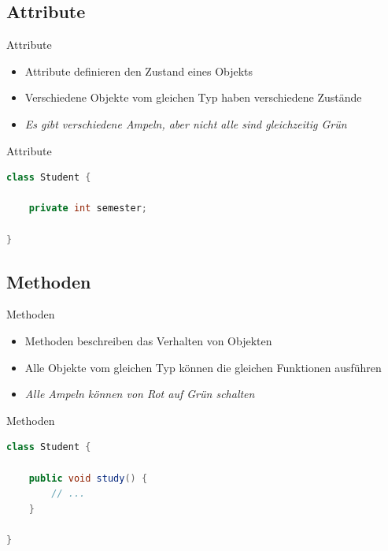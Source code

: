 \documentclass[18pt]{beamer}
\begin{document}
\subsection{Attribute}

\begin{frame}{Attribute}
    \begin{itemize}
        \item Attribute definieren den Zustand eines Objekts
        \item Verschiedene Objekte vom gleichen Typ haben verschiedene Zustände
        \item \textit{Es gibt verschiedene Ampeln, aber nicht alle sind gleichzeitig Grün}
    \end{itemize}
\end{frame}

\begin{frame}[fragile]{Attribute}
    \begin{exampleblock}{}
        \begin{lstlisting}[language=Java]
class Student {

    private int semester;

}
        \end{lstlisting}
    \end{exampleblock}
\end{frame}

\subsection{Methoden}

\begin{frame}{Methoden}
    \begin{itemize}
        \item Methoden beschreiben das Verhalten von Objekten
        \item Alle Objekte vom gleichen Typ können die gleichen Funktionen ausführen
        \item \textit{Alle Ampeln können von Rot auf Grün schalten}
    \end{itemize}
\end{frame}

\begin{frame}[fragile]{Methoden}
    \begin{exampleblock}{}
        \begin{lstlisting}[language=Java]
class Student {

    public void study() {
        // ...
    }

}
        \end{lstlisting}
    \end{exampleblock}
\end{frame}
\end{document}
